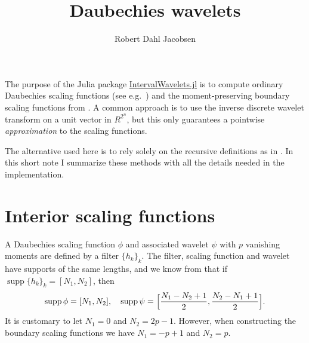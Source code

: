 \documentclass[a4paper]{scrartcl}
\title{Daubechies wavelets}
\author{Robert Dahl Jacobsen}
\DeclareMathOperator\supp{supp}
\begin{document}
\maketitle

The purpose of the Julia package \href{https://github.com/robertdj/IntervalWavelets.jl}{IntervalWavelets.jl} is to compute ordinary Daubechies scaling functions (see e.g.\ \cite{Mallat:2009}) and the moment-preserving boundary scaling functions from \cite{Cohen:Daubechies:Vial:1993}.
A common approach is to use the inverse discrete wavelet transform on a unit vector in $R^{2^n}$, but this only guarantees a pointwise \emph{approximation} to the scaling functions.

The alternative used here is to rely solely on the recursive definitions as in \cite{Strang:1989}.
In this short note I summarize these methods with all the details needed in the implementation.


\section{Interior scaling functions}
\label{sec:internal}

A Daubechies scaling function $\phi$ and associated wavelet $\psi$ with $p$ vanishing moments are defined by a filter $\{h_k\}_k$.
The filter, scaling function and wavelet have supports of the same lengths, and we know from \cite[Theorem 7.5]{Mallat:2009} that if $\supp \{h_k\}_k = [N_1, N_2]$, then 
\begin{equation*}
	\supp\phi = [N_1, N_2],
	\quad
	\supp\psi = \Bigl[\frac{N_1-N_2+1}2, \frac{N_2-N_1+1}2\Bigr].
\end{equation*}
It is customary to let $N_1 = 0$ and $N_2 = 2p-1$.
However, when constructing the boundary scaling functions we have $N_1 = -p+1$ and $N_2 = p$.
\end{document}
